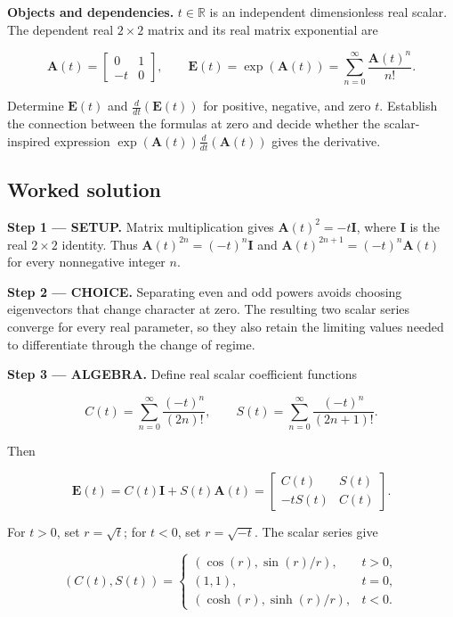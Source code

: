 \documentclass[11pt,oneside,openany]{book}
\begin{document}
\textbf{Objects and dependencies.} \(t\in\mathbb R\) is an independent dimensionless real scalar. The dependent real \(2\times2\) matrix and its real matrix exponential are

\[
\mathbf A(t)=\begin{bmatrix}0&1\\-t&0\end{bmatrix},\qquad
\mathbf E(t)=\exp(\mathbf A(t))
=\sum_{n=0}^{\infty}\frac{\mathbf A(t)^n}{n!}.
\]

Determine \(\mathbf E(t)\) and \(\frac{d}{dt}(\mathbf E(t))\) for positive, negative, and zero \(t\). Establish the connection between the formulas at zero and decide whether the scalar-inspired expression \(\exp(\mathbf A(t))\frac{d}{dt}(\mathbf A(t))\) gives the derivative.
\subsection*{Worked solution}

\textbf{Step 1 --- SETUP.} Matrix multiplication gives \(\mathbf A(t)^2=-t\mathbf I\), where \(\mathbf I\) is the real \(2\times2\) identity. Thus \(\mathbf A(t)^{2n}=(-t)^n\mathbf I\) and \(\mathbf A(t)^{2n+1}=(-t)^n\mathbf A(t)\) for every nonnegative integer \(n\).

\begin{ChoiceStep}
\textbf{Step 2 --- CHOICE.} Separating even and odd powers avoids choosing eigenvectors that change character at zero. The resulting two scalar series converge for every real parameter, so they also retain the limiting values needed to differentiate through the change of regime.

\end{ChoiceStep}
\begingroup\color{AlgebraBlue}
\textbf{Step 3 --- ALGEBRA.} Define real scalar coefficient functions

\[
C(t)=\sum_{n=0}^{\infty}\frac{(-t)^n}{(2n)!},\qquad
S(t)=\sum_{n=0}^{\infty}\frac{(-t)^n}{(2n+1)!}.
\]

Then

\[
\mathbf E(t)=C(t)\mathbf I+S(t)\mathbf A(t)
=\begin{bmatrix}C(t)&S(t)\\-tS(t)&C(t)\end{bmatrix}.
\]

For \(t>0\), set \(r=\sqrt t\); for \(t<0\), set \(r=\sqrt{-t}\). The scalar series give

\[
(C(t),S(t))=
\begin{cases}
(\cos(r),\sin(r)/r),&t>0,\\
(1,1),&t=0,\\
(\cosh(r),\sinh(r)/r),&t<0.
\end{cases}
\]
\end{document}
